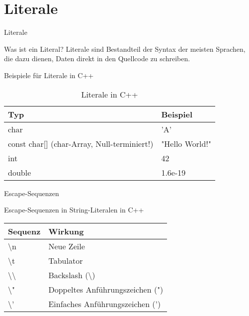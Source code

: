 \section{Literale}
\begin{frame}{Literale}
    \begin{block}{Was ist ein Literal?}
    Literale sind Bestandteil der Syntax der meisten Sprachen, die dazu dienen, Daten direkt in den Quellcode zu schreiben.
    \end{block}
    \pause
    \begin{block}{Beispiele für Literale in C++}
    \begin{table}
    \center
    \begin{tabular}{ll}
        \toprule
        Typ & Beispiel \\
        \midrule
        char & 'A' \\
        const char[] (char-Array, Null-terminiert!) & "Hello World!" \\
        int & 42 \\
        double & 1.6e-19 \\
        \bottomrule
    \end{tabular}
    \caption{Literale in C++}
    \end{table}
    \end{block}
\end{frame}

\begin{frame}{Escape-Sequenzen}
    \begin{block}{Escape-Sequenzen in String-Literalen in C++}
    \begin{table}
    \center
    \begin{tabular}{ll}
        \toprule
        Sequenz & Wirkung \\
        \midrule
        \textbackslash n & Neue Zeile \\
        \textbackslash t & Tabulator \\
        \textbackslash\textbackslash & Backslash (\textbackslash) \\
        \textbackslash" & Doppeltes Anführungszeichen (") \\
        \textbackslash' & Einfaches Anführungszeichen (') \\
        \bottomrule
    \end{tabular}
    \end{table}
    \end{block}
\end{frame}

